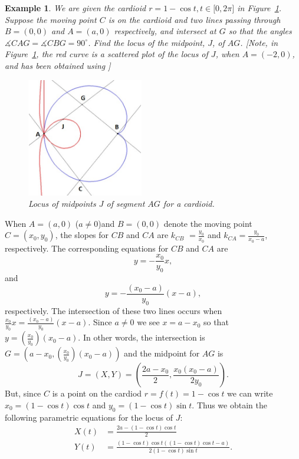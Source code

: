 \documentclass[12pt,a4paper]{article}%
\newtheorem{example}[theorem]{Example}
\begin{document}
\begin{example} \label{ex9}
We are given the cardioid $r=1-\cos t,t\in\lbrack0,2\pi]$ in Figure~\ref{fig13}.
Suppose the moving point $C$ is on the cardioid and two lines passing through
$B=(0,0)$ and $A=(a,0)$ respectively, and intersect at $G$ so that the angles
$\measuredangle CAG=\measuredangle CBG=90^{\circ}$.
Find the locus of the midpoint, $J$, of $AG$.
[Note, in Figure~\ref{fig13}, the red curve is a scattered plot
of the locus of $J$,
when $A=\left(  -2,0\right)$, and has been obtained using
\cite{CP}]%
\begin{figure}[htbp]
\begin{center}
 \includegraphics[height=2.0427in,keepaspectratio]{Figure3-crop.pdf}
\end{center}
 \caption{Locus of midpoints $J$ of segment $AG$ for a cardioid.}
 \label{fig13}
\end{figure}

\end{example}

When $A=(a,0)$ ($a\ne0$)and $B=(0,0)$ denote the moving point $C=(x_{0},y_{0})$,
the slopes for $CB$ and $CA$ are $k_{CB}$ $=\frac{y_{0}}{x_{0}}$ and
$k_{CA}=\frac{y_{0}}{x_{0}-a}$, respectively. The corresponding equations
for $CB$ and $CA$ are
\begin{equation}
y=-\frac{x_{0}}{y_{0}}x, \label{eq3}
\end{equation}
and
\begin{equation}
y=-\frac{\left(  x_{0}-a\right)  }{y_{0}}\left(  x-a\right), \label{eq4}
\end{equation}
respectively. The intersection of these two lines occurs when
$\frac{x_{0}}{y_{0}}x=\frac{\left(  x_{0}-a\right)  }{y_{0}}\left(  x-a\right) $.
Since $a\neq0$ we see $x=a-x_{0}$ so that $y=\left(  \frac{x_{0}}{y_{0}}\right) \left(  x_{0}-a\right)$.
In other words, the intersection is
$G=(a-x_{0},\allowbreak\left(  \frac{x_{0}}{y_{0}}\right)  \left(x_{0}-a\right)  )$
and the midpoint for $AG$ is
\[
J=\left(  X,Y\right)  =\left(  \frac{2a-x_{0}}{2},\frac{x_{0}\left(x_{0}-a\right)  }{2y_{0}}\right).
\]
But, since $C$ is a point on the cardiod $r=f(t)=1-\cos t$ we can write
$x_{0}=(1-\cos t)\cos t$ and $y_{0}=(1-\cos t)\sin t$.
Thus we obtain the following parametric equations for the locus of $J$:
\begin{align*}
X(t)  & =\frac{2a-\left(  1-\cos t\right)  \cos t}{2}\\
Y(t)  & =\frac{\left(  1-\cos t\right)  \cos t\left(  \left(  1-\cos t\right)
\cos t-a\right)  }{2\left(  1-\cos t\right)  \sin t}.
\end{align*}
\end{document}

